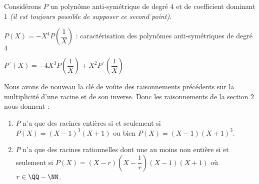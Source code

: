 Considérons $P$ un polynôme anti-symétrique de degré $4$ et de coefficient dominant $1$ \emph{(il est toujours possible de supposer ce second point)}.

\medskip

$P(X) = -X^4 P\left( \dfrac1X \right)$ : caractérisation des polynômes anti-symétriques de degré $4$

\medskip

$P\,^{\prime}(X) = - 4 X^3 P\left( \dfrac1X \right) 
            + X^2 P\,^{\prime}\left( \dfrac1X \right)$


\medskip

Nous avons de nouveau la clé de voûte des raisonnements précédents sur la multiplicité d'une racine et de son inverse.
Donc les raisonnements de la section 2 nous donnent :

\begin{enumerate}
	\item $P$ n'a que des racines entières si et seulement si $P(X) = (X - 1)^3 (X + 1)$ ou bien $P(X) = (X - 1) (X + 1)^3$.

	\item $P$ n'a que des racines rationnelles dont une au moins non entière si et seulement si $P(X) = (X - r) \left( X - \dfrac1r \right) (X - 1) (X + 1)$ où $r \in \QQ - \NN$.
\end{enumerate}



